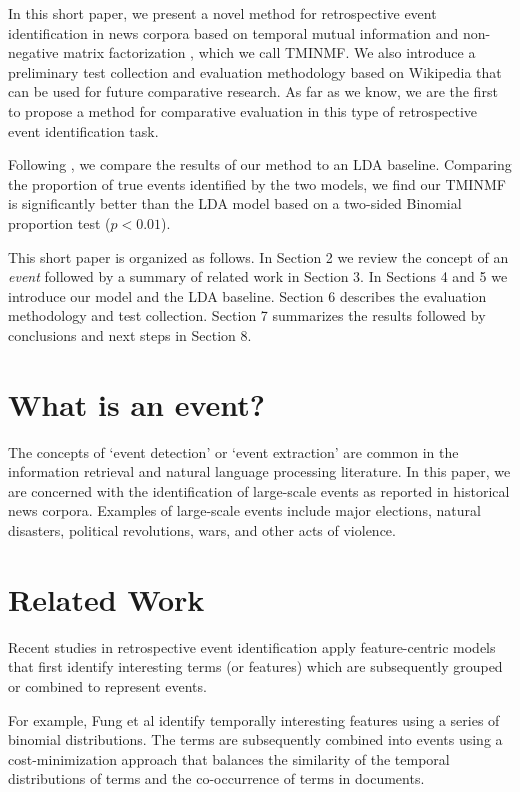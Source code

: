 \documentclass{sig-alternate}
\begin{document}
In this short paper, we present a novel method for retrospective event identification in news corpora based on temporal mutual information \cite{Teng2008} and non-negative matrix factorization \cite{Lee2001}, which we call TMINMF. We also introduce a preliminary test collection and evaluation methodology based on Wikipedia that can be used for future comparative research.  As far as we know, we are the first to propose a method for comparative evaluation in this type of retrospective event identification task.

Following \cite{Weng2011}, we compare the results of our method to an LDA baseline. Comparing the proportion of true events identified by the two models, we find our TMINMF is significantly better than the LDA model based on a two-sided Binomial proportion test ($p < 0.01$).

This short paper is organized as follows. In Section 2 we review the concept of an \emph{event} followed by a summary of related work in Section 3. In Sections 4 and 5 we introduce our model and the LDA baseline. Section 6 describes the evaluation methodology and test collection. Section 7 summarizes the results followed by conclusions and next steps in Section 8.

\section{What is an event?}

The concepts of `event detection' or `event extraction' are common in the information retrieval and natural language processing literature. In this paper, we are concerned with the identification of large-scale events as reported in historical news corpora.   Examples of large-scale events include major elections, natural disasters, political revolutions, wars, and other acts of violence.


\section{Related Work}

Recent studies in retrospective event identification apply feature-centric models \cite{Yi, Fung2005, Chen2009, Teng2008, Weng2011} that first identify interesting terms (or features) which are subsequently grouped or combined to represent events. 

For example, Fung et al \cite{Fung2005} identify temporally interesting features using a series of binomial distributions. The terms are subsequently combined  into events using a cost-minimization approach that balances the similarity of the temporal distributions of terms and the co-occurrence of terms in documents. 
\end{document}
